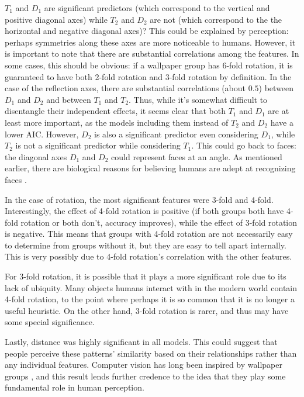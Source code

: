 $T_1$ and $D_1$ are significant predictors (which correspond to the vertical and positive diagonal axes) while $T_2$ and $D_2$ are not (which correspond to the the horizontal and negative diagonal axes)? This could be explained by perception: perhaps symmetries along these axes are more noticeable to humans. However, it is important to note that there are substantial correlations among the features. In some cases, this should be obvious: if a wallpaper group has 6-fold rotation, it is guaranteed to have both 2-fold rotation and 3-fold rotation by definition. In the case of the reflection axes, there are substantial correlations (about $0.5$) between $D_1$ and $D_2$ and between $T_1$ and $T_2$. Thus, while it's somewhat difficult to disentangle their independent effects, it seems clear that both $T_1$ and $D_1$ are at least more important, as the models including them instead of $T_2$ and $D_2$ have a lower AIC. However, $D_2$ is also a significant predictor even considering $D_1$, while $T_2$ is not a significant predictor while considering $T_1$. This could go back to faces: the diagonal axes $D_1$ and $D_2$ could represent faces at an angle. As mentioned earlier, there are biological reasons for believing humans are adept at recognizing faces \cite{ffa}.     

In the case of rotation, the most significant features were 3-fold and 4-fold. Interestingly, the effect of 4-fold rotation is positive (if both groups both have 4-fold rotation or both don't, accuracy improves), while the effect of 3-fold rotation is negative. This means that groups with 4-fold rotation are not necessarily easy to determine from groups without it, but they are easy to tell apart internally. This is very possibly due to 4-fold rotation's correlation with the other features.

For 3-fold rotation, it is possible that it plays a more significant role due to its lack of ubiquity. Many objects humans interact with in the modern world contain 4-fold rotation, to the point where perhaps it is so common that it is no longer a useful heuristic. On the other hand, 3-fold rotation is rarer, and thus may have some special significance.

Lastly, distance was highly significant in all models. This could suggest that people perceive these patterns' similarity based on their relationships rather than any individual features. Computer vision has long been inspired by wallpaper groups \citep{yanxi1,yanxi2}, and this result lends further credence to the idea that they play some fundamental role in human perception.